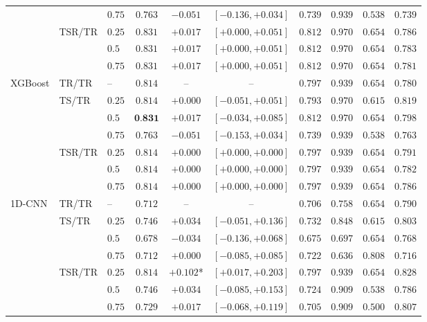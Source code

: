\documentclass[12pt]{article}
\theoremstyle{paper}
\begin{document}
\begin{table}[H]
\begin{tabular*}{\textwidth}{@{\extracolsep{\fill}}lllccccccc}
 &  & $0.75$ & $0.763$ & $-0.051$ & $[-0.136, +0.034]$ & $0.739$ & $0.939$ & $0.538$ & $0.739$\\
\cmidrule(lr){2-10}
 & \multirow{3}{*}{TSR/TR} & $0.25$ & $0.831$ & $+0.017$ & $[+0.000, +0.051]$ & $0.812$ & $0.970$ & $0.654$ & $0.786$\\
 &  & $0.5$ & $0.831$ & $+0.017$ & $[+0.000, +0.051]$ & $0.812$ & $0.970$ & $0.654$ & $0.783$\\
 &  & $0.75$ & $0.831$ & $+0.017$ & $[+0.000, +0.051]$ & $0.812$ & $0.970$ & $0.654$ & $0.781$\\
\midrule
\multirow{7}{*}{XGBoost} & TR/TR & -- & $0.814$ & -- & -- & $0.797$ & $0.939$ & $0.654$ & $0.780$\\
\cmidrule(lr){2-10}
 & \multirow{3}{*}{TS/TR} & $0.25$ & $0.814$ & $+0.000$ & $[-0.051, +0.051]$ & $0.793$ & $0.970$ & $0.615$ & $0.819$\\
 &  & $0.5$ & $\textbf{0.831}$ & $+0.017$ & $[-0.034, +0.085]$ & $0.812$ & $0.970$ & $0.654$ & $0.798$\\
 &  & $0.75$ & $0.763$ & $-0.051$ & $[-0.153, +0.034]$ & $0.739$ & $0.939$ & $0.538$ & $0.763$\\
\cmidrule(lr){2-10}
 & \multirow{3}{*}{TSR/TR} & $0.25$ & $0.814$ & $+0.000$ & $[+0.000, +0.000]$ & $0.797$ & $0.939$ & $0.654$ & $0.791$\\
 &  & $0.5$ & $0.814$ & $+0.000$ & $[+0.000, +0.000]$ & $0.797$ & $0.939$ & $0.654$ & $0.782$\\
 &  & $0.75$ & $0.814$ & $+0.000$ & $[+0.000, +0.000]$ & $0.797$ & $0.939$ & $0.654$ & $0.786$\\
\midrule
\multirow{7}{*}{1D-CNN} & TR/TR & -- & $0.712$ & -- & -- & $0.706$ & $0.758$ & $0.654$ & $0.790$\\
\cmidrule(lr){2-10}
 & \multirow{3}{*}{TS/TR} & $0.25$ & $0.746$ & $+0.034$ & $[-0.051, +0.136]$ & $0.732$ & $0.848$ & $0.615$ & $0.803$\\
 &  & $0.5$ & $0.678$ & $-0.034$ & $[-0.136, +0.068]$ & $0.675$ & $0.697$ & $0.654$ & $0.768$\\
 &  & $0.75$ & $0.712$ & $+0.000$ & $[-0.085, +0.085]$ & $0.722$ & $0.636$ & $0.808$ & $0.716$\\
\cmidrule(lr){2-10}
 & \multirow{3}{*}{TSR/TR} & $0.25$ & $0.814$ & $+0.102$* & $[+0.017, +0.203]$ & $0.797$ & $0.939$ & $0.654$ & $0.828$\\
 &  & $0.5$ & $0.746$ & $+0.034$ & $[-0.085, +0.153]$ & $0.724$ & $0.909$ & $0.538$ & $0.786$\\
 &  & $0.75$ & $0.729$ & $+0.017$ & $[-0.068, +0.119]$ & $0.705$ & $0.909$ & $0.500$ & $0.807$\\

\end{tabular*}
\end{table}
\end{document}
